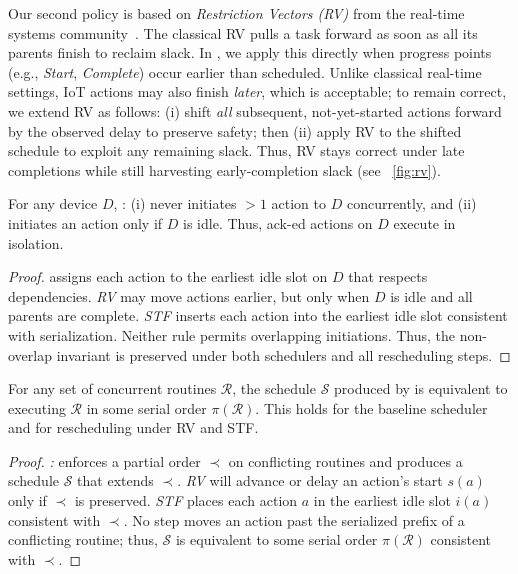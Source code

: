{
Our second policy is based on \emph{Restriction Vectors (RV)} from the real-time systems  community~\cite{manimaran1997new}.  
The classical RV pulls a task forward as soon as all its parents finish to reclaim slack.
In \sysname{}, we apply this directly when progress points (e.g., \textit{Start}, \textit{Complete}) occur earlier than scheduled.
Unlike classical real-time settings, IoT actions may also finish \emph{later}, which is acceptable; to remain correct, we extend RV as follows:
(i) shift \textit{all} subsequent, not-yet-started actions forward by the observed delay to preserve safety; then
(ii) apply RV to the shifted schedule to exploit any remaining slack.
Thus, RV stays correct under late completions while still harvesting early-completion slack (see \Figure~\ref{fig:rv}).
}

{

\begin{theorem}
\label{thm:safety}
{For any device $D$, \sysname{}: (i) never initiates $>1$  action to $D$ concurrently, and  (ii) initiates an action only if $D$ is idle. Thus, ack-ed actions on $D$ execute in isolation.
}
\end{theorem}
\vspace{-0.5cm}
\begin{proof}
\emph{\scheduler} assigns each action to the earliest idle slot on $D$ that respects dependencies.  
\emph{RV} may move actions earlier, but only when $D$ is idle and all parents are complete.
\emph{STF} inserts each action into the earliest idle slot consistent with serialization. Neither rule permits overlapping initiations.  
Thus, the non-overlap invariant is preserved under both schedulers and all rescheduling steps.
\end{proof}


\begin{theorem}
\label{thm:serial}
For any set of concurrent routines $\mathcal{R}$, the schedule $\mathcal{S}$ produced by \sysname{} is equivalent to executing $\mathcal{R}$ in some serial order $\pi(\mathcal{R})$.
This holds for the baseline scheduler and for rescheduling under RV and STF.
\end{theorem}
\vspace{-0.5cm}
\begin{proof}
\emph{\scheduler:} enforces a partial order $\prec$ on conflicting routines and produces a schedule $\mathcal{S}$ that extends $\prec$.
\emph{RV} will
advance or delay an action’s start $s(a)$ only if $\prec$ is preserved.
\emph{STF} places each action $a$ in the earliest idle slot $i(a)$ consistent with $\prec$. 
No step moves an action past the serialized prefix of a conflicting routine;
thus, $\mathcal{S}$ is equivalent to some serial order $\pi(\mathcal{R})$ consistent with $\prec$.
\end{proof}
}
